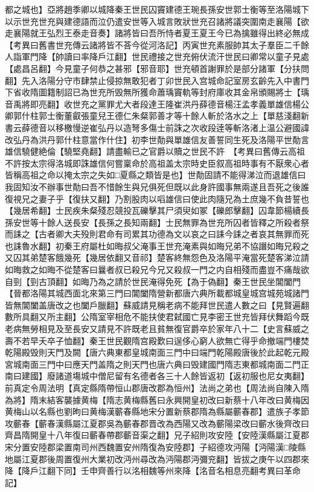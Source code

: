 都之城也】亞將趙季卿以城降秦王世民囚竇建德王琬長孫安世郭士衡等至洛陽城下以示世充世充與建德語而泣仍遣安世等入城言敗狀世充召諸將議突圍南走襄陽【欲走襄陽就王弘烈王泰走音奏】諸將皆曰吾所恃者夏王夏王今已為擒雖得出終必無成　【考異曰舊書世充傳云諸將皆不荅今從河洛記】丙寅世充素服帥其太子羣臣二千餘人詣軍門降【帥讀曰率降戶江翻】世民禮接之世充俯伏流汗世民曰卿常以童子見處【處昌呂翻】今見童子何恭之甚邪【邪音耶】世充頓首謝罪於是部分諸軍【分扶問翻】先入洛陽分守市肆禁止侵掠無敢犯者丁卯世民入宫城命記室房玄齡先入中書門下省收隋圖籍制詔已為世充所毁無所獲命蕭瑀竇軌等封府庫收其金帛頒賜將士【瑀音禹將即亮翻】收世充之黨罪尤大者段達王隆崔洪丹薛德音楊汪孟孝義單雄信楊公卿郭什柱郭士衡董叡張童兒王德仁朱粲郭善才等十餘人斬於洛水之上【單慈淺翻新書云薛德音以移檄慢逆崔弘丹以造弩多傷士前誅之次收段逹等斬洛渚上温公避國諱改弘丹為洪丹郭什柱意當作什住】初李世勣與單雄信友善誓同生死及洛陽平世勣言雄信驍健絶倫【驍堅堯翻】請盡輸已之官爵以贖之世民不許　【考異曰舊傳云高祖不許按太宗得洛城即誅雄信何嘗稟命於高祖盖太宗時史臣叙高祖時事有不厭衆心者皆稱高祖之命以掩太宗之失如□夏縣之類皆是也】世勣固請不能得涕泣而退雄信曰我固知汝不辦事世勣曰吾不惜餘生與兄俱死但既以此身許國事無兩遂且吾死之後誰復視兄之妻子乎【復扶又翻】乃割股肉以㗖雄信曰使此肉隨兄為土庶幾不負昔誓也【幾居希翻】士民疾朱粲殘忍競投瓦礫擊其尸須臾如冢【礫郎擊翻】囚韋節楊續長孫安世等十餘人送長安【長孫之長知兩翻】士民無罪為世充所囚者皆釋之所殺者祭而誄之【古者卿大夫殁則君命有司累其功德為文以哀之曰誄今誄之者哀其無罪而死也誄魯水翻】初秦王府屬杜如晦叔父淹事王世充淹素與如晦兄弟不協譖如晦兄殺之又囚其弟楚客餓幾死【幾居依翻又音祁】楚客終無怨色及洛陽平淹當死楚客涕泣請如晦救之如晦不從楚客曰曩者叔已殺兄今兄又殺叔一門之内自相殘而盡豈不痛哉欲自剄【剄古頂翻】如晦乃為之請於世民淹得免死【為于偽翻】秦王世民坐閶闔門【晉都洛陽其城西面北來第三門曰閶闔隋營新都唐六典所載都城皇城宫城苑城諸門皆無閶闔盖唐改之也闔戶臘翻】蘇威請見稱老病不能拜世民遣人數之曰【見賢遍翻數所具翻又所主翻】公隋室宰相危不能扶使君弑國亡見李密王世充皆拜伏舞蹈今既老病無勞相見及至長安又請見不許既老且貧無復官爵卒於家年八十二【史言蘇威之壽不若早夭卒子恤翻】秦王世民觀隋宫殿歎曰逞侈心窮人欲無亡得乎命撤端門樓焚乾陽殿毁則天門及闕【唐六典東都皇城南面三門中曰端門乾陽殿唐後於此起乾元殿宮城南面三門中曰應天門盖隋之則天門也唐六典曰毁建國門隋志東都城南面二門正南曰建國】廢諸道塲城中僧尼留有名德者各三十人餘皆返初【返初服也尼女夷翻】　前真定令周法明【真定縣隋帶恒山郡唐改郡為恒州】法尚之弟也【周法尚自陳入隋為將】隋末結客襲據黄梅【隋志黄梅縣舊曰永興開皇初改曰新蔡十八年改曰黄梅因黄梅山以名縣也劉昫曰黄梅漢蘄春縣地宋分置新蔡郡隋為縣屬蘄春郡】遣族子孝節攻蘄春【蘄春漢縣屬江夏郡吳為蘄春郡晋改為西陽又改為蘄陽梁改曰蘄水後齊改曰齊昌隋開皇十八年復曰蘄春帶郡蘄音渠之翻】兄子紹則攻安陸【安陸漢縣屬江夏郡宋分置安陸郡梁置南司州西魏置安州隋復為安陸郡】子紹德攻沔陽【沔陽漢□陵縣地屬江夏郡後周置復州大業初改沔州尋改為沔陽郡沔彌兖翻】皆拔之庚午以四郡來降【降戶江翻下同】壬申齊善行以洺相魏等州來降【洺音名相息亮翻考異曰革命記】


